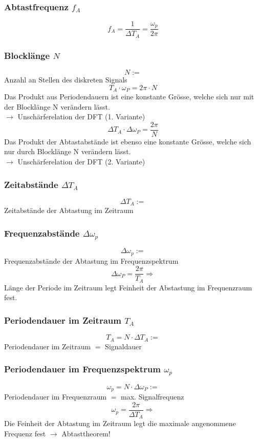 \documentclass[12pt,a4paper]{scrartcl}
\begin{document}
\subsubsection{Abtastfrequenz $f_A$}
\label{sec:sub:sub:abtastfrequenz}
$$f_A = \frac{1}{\Delta T_A} = \frac{\omega_p}{2\pi}$$

\subsubsection{Blocklänge $N$}
\label{sec:sub:sub:blocklaenge}
$$N :=$$ Anzahl an Stellen des diskreten Signals
$$T_A \cdot \omega_P = 2\pi \cdot N$$ Das Produkt aus Periodendauern ist eine konstante Grösse, welche sich nur mit der Blocklänge N verändern lässt.\\
$\to$ Unschärferelation der DFT (1. Variante)
$$\Delta T_A \cdot \Delta \omega_P = \frac{2\pi}{N}$$ Das Produkt der Abtastabstände ist ebenso eine konstante Grösse, welche sich nur durch Blocklänge N verändern lässt.\\
$\to$ Unschärferelation der DFT (2. Variante)

\subsubsection{Zeitabstände $\Delta T_A$}
\label{sec:sub:sub:delta-t-a}
$$\Delta T_A :=$$ Zeitabstände der Abtastung im Zeitraum

\subsubsection{Frequenzabstände $\Delta \omega_p$}
\label{sec:sub:sub:delta-omega-p}
$$\Delta \omega_p :=$$ Frequenzabstände der Abtastung im Frequenzspektrum \\
$$\Delta \omega_P = \frac{2\pi}{T_A} \Rightarrow$$ Länge der Periode im Zeitraum legt Feinheit der Abstastung im Frequenzraum fest.

\subsubsection{Periodendauer im Zeitraum $T_A$}
\label{sec:sub:sub:t-a}
$$T_A = N \cdot \Delta T_A :=$$ Periodendauer im Zeitraum $=$ Signaldauer

\subsubsection{Periodendauer im Frequenzspektrum $\omega_p$}
\label{sec:sub:sub:omega-p}
$$\omega_p = N \cdot \Delta \omega_P :=$$ Periodendauer im Frequenzraum $=$ max. Signalfrequenz\\
$$\omega_p = \frac{2\pi}{\Delta T_A} \Rightarrow$$ Die Feinheit der Abtastung im Zeitraum legt die maximale angenommene Frequenz fest $\to$ Abtasttheorem!
\end{document}
